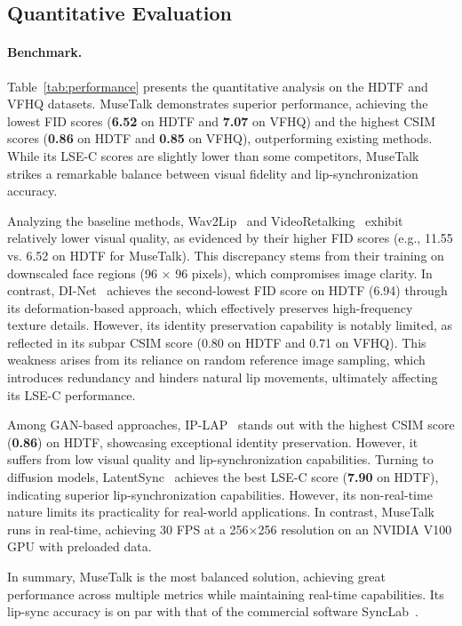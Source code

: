 \subsection{Quantitative Evaluation}
\paragraph{Benchmark.} 
Table~\ref{tab:performance} presents the quantitative analysis on the HDTF and VFHQ datasets. 
MuseTalk demonstrates superior performance, achieving the lowest FID scores (\textbf{6.52} on HDTF and \textbf{7.07} on VFHQ) and the highest CSIM scores (\textbf{0.86} on HDTF and \textbf{0.85} on VFHQ),  outperforming existing methods. 
While its LSE-C scores are slightly lower than some competitors, MuseTalk strikes a remarkable balance between visual fidelity and lip-synchronization accuracy.

Analyzing the baseline methods, Wav2Lip~\cite{prajwal2020lip} and VideoRetalking~\cite{cheng2022videoretalking} exhibit relatively lower visual quality, as evidenced by their higher FID scores (e.g., 11.55 vs. 6.52 on HDTF for MuseTalk). This discrepancy stems from their training on downscaled face regions (96 × 96 pixels), which compromises image clarity. In contrast, DI-Net~\cite{zhang2023dinet} achieves the second-lowest FID score on HDTF (6.94) through its deformation-based approach, which effectively preserves high-frequency texture details. However, its identity preservation capability is notably limited, as reflected in its subpar CSIM score (0.80 on HDTF and 0.71 on VFHQ). This weakness arises from its reliance on random reference image sampling, which introduces redundancy and hinders natural lip movements, ultimately affecting its LSE-C performance.

Among GAN-based approaches, IP-LAP~\cite{zhong2023identity} stands out with the highest CSIM score (\textbf{0.86}) on HDTF, showcasing exceptional identity preservation. However, it suffers from low visual quality and lip-synchronization capabilities.
Turning to diffusion models, LatentSync~\cite{li2024latentsync} achieves the best LSE-C score (\textbf{7.90} on HDTF), indicating superior lip-synchronization capabilities. However, its non-real-time nature limits its practicality for real-world applications. In contrast, MuseTalk runs in real-time, achieving 30 FPS at a 256×256 resolution on an NVIDIA V100 GPU with preloaded data.

In summary, MuseTalk is the most balanced solution, achieving great performance across multiple metrics while maintaining real-time capabilities. Its lip-sync accuracy is on par with that of the commercial software SyncLab~\cite{sync_so_projects}.

